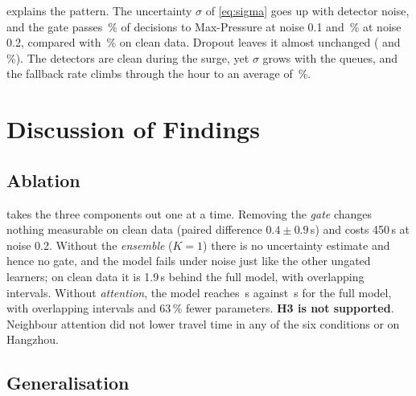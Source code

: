  explains the pattern. The uncertainty $\sigma$ of \cref{eq:sigma} goes up
with detector noise, and the gate passes \,\% of decisions to
Max-Pressure at noise 0.1 and \,\% at noise 0.2, compared with
\,\% on clean data. Dropout leaves it almost unchanged
( and \,\%). The detectors are clean during
the surge, yet $\sigma$ grows with the queues, and the fallback rate climbs through the hour
to an average of \,\%.

\section{Discussion of Findings}
\label{sec:discussion}

\subsection{Ablation}
\begin{table}[t]
\centering\footnotesize
\setlength{\tabcolsep}{2.6pt}
\caption[Ablation of gate, attention and ensemble]{Ablation on the Jinan test flow (5 seeds). Travel time in seconds for three
conditions; $\Delta$ = difference to the full model on clean data; maximum wait in seconds;
FB = fallback rate on clean data.}
\label{tab:ablation}

\end{table}

 takes the three components out one at a time. Removing the
\emph{gate} changes nothing measurable on clean data (paired difference $0.4\pm0.9$\,s) and
costs 450\,s at noise 0.2. Without the \emph{ensemble} ($K=1$) there is no uncertainty
estimate and hence no gate, and the model fails under noise just like the other ungated
learners; on clean data it is 1.9\,s behind the full model, with overlapping intervals.
Without \emph{attention}, the model reaches \,s against
\,s for the full model, with overlapping intervals and 63\,\% fewer
parameters. \textbf{H3 is not supported}. Neighbour attention did not lower travel time in
any of the six conditions or on Hangzhou.

\subsection{Generalisation}
\begin{table}[t]
\centering\footnotesize
\setlength{\tabcolsep}{3.6pt}
\caption[Zero-shot generalisation to Hangzhou]{Zero-shot evaluation on Hangzhou ($4\times4$, three flows, 5 seeds): average
travel time in seconds. Models were trained on the Jinan training flow and thresholds come
from Jinan validation. ``All flows'' averages the flows per seed; maximum wait and fallback
rate (FB) are over all flows. Bold: lowest travel time.}
\label{tab:heldout}

\end{table}

